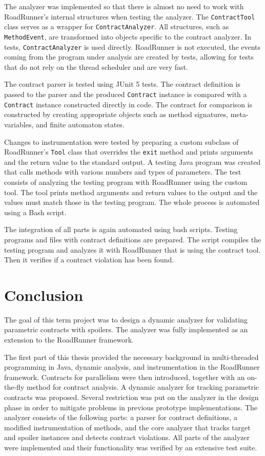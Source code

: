 The analyzer was implemented so that there is almost no need to work with
RoadRunner's internal structures when testing the analyzer. The
\texttt{ContractTool} class serves as a wrapper for \texttt{ContractAnalyzer}.
All structures, such as \texttt{MethodEvent}, are transformed into objects
specific to the contract analyzer. In tests, \texttt{ContractAnalyzer} is used
directly. RoadRunner is not executed, the events coming from the program under
analysis are created by tests, allowing for tests that do not rely on the
thread scheduler and are very fast.

The contract parser is tested using JUnit 5 tests. The contract definition is
passed to the parser and the produced \texttt{Contract} instance is compared
with a \texttt{Contract} instance constructed directly in code. The contract for
comparison is constructed by creating appropriate objects such as method
signatures, meta-variables, and finite automaton states.

Changes to instrumentation were tested by preparing a custom subclass of
RoadRunner's \texttt{Tool} class that overrides the \texttt{exit} method and
prints arguments and the return value to the standard output. A testing Java
program was created that calls methods with various numbers and types of
parameters. The test consists of analyzing the testing program with RoadRunner
using the custom tool. The tool prints method arguments and return values to the
output and the values must match those in the testing program. The whole process
is automated using a Bash script.

The integration of all parts is again automated using bash scripts. Testing
programs and files with contract definitions are prepared. The script compiles
the testing program and analyzes it with RoadRunner that is using the contract
tool. Then it verifies if a contract violation has been found.



\chapter{Conclusion}

The goal of this term project was to design a dynamic analyzer for validating
parametric contracts with spoilers. The analyzer was fully implemented as an
extension to the RoadRunner framework.

The first part of this thesis provided the necessary background in
multi-threaded programming in Java, dynamic analysis, and instrumentation in the
RoadRunner framework. Contracts for parallelism were then introduced, together
with an on-the-fly method for contract analysis. A dynamic analyzer for tracking
parametric contracts was proposed. Several restriction was put on the analyzer
in the design phase in order to mitigate problems in previous prototype
implementations. The analyzer consists of the following parts: a parser for
contract definitions, a modified instrumentation of methods, and the core
analyzer that tracks target and spoiler instances and detects contract
violations. All parts of the analyzer were implemented and their functionality
was verified by an extensive test suite.

